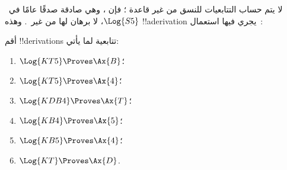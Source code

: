 \documentclass[../../../include/open-logic-section]{subfiles}
\begin{document}
\begin{ex}
لا يتم حساب التتابعيات للنسق  من غير قاعدة \Cut{}؛ فإن
، وهي صادقة صدقًا عامًا في~$\Log{S5}$، لا برهان لها
من غير~\Cut. وهذه !!a{derivation} يجري فيها استعمال~\Cut:
\begin{prooftree}
\end{prooftree}
\end{ex}

\begin{prob}
أقم !!{derivation}s تتابعية لما يأتي:
  \begin{enumerate}
  \item $\Log{KT5} \Proves \Ax{B}$؛
  \item $\Log{KT5} \Proves \Ax{4}$؛
  \item $\Log{KDB4} \Proves \Ax{T}$؛
  \item $\Log{KB4} \Proves \Ax{5}$؛
  \item $\Log{KB5} \Proves \Ax{4}$؛
  \item $\Log{KT} \Proves \Ax{D}$.
  \end{enumerate}
\end{prob}
\end{document}

